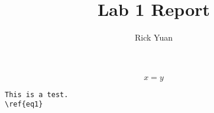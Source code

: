 \documentclass[11pt]{article}
\title{Lab 1 Report}
\author{Rick Yuan}
\begin{document}
\maketitle


\begin{equation}
	x=y
	\label{eq1}
\end{equation}

\begin{lstlisting}[style=lstMat]
This is a test. 
\ref{eq1}




\end{lstlisting}
\end{document}
